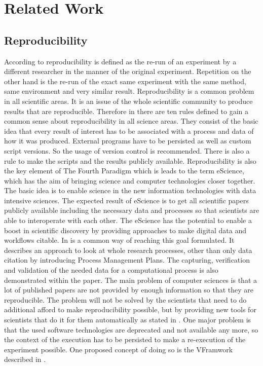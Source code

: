 \documentclass[draft,final]{vutinfth} %
\begin{document}
\chapter{Related Work}\label{Related Work}


\section{Reproducibility}\label{Reproducibility}
According to \cite{6064509} reproducibility is defined as the re-run of an experiment by a different researcher in the manner of the original experiment. Repetition on the other hand is the re-run of the exact same experiment with the same method, same environment and very similar result. 
Reproducibility is a common problem in all scientific areas. It is an issue of the whole scientific community to produce results that are reproducible. Therefore in \cite{10.1371/journal.pcbi.1003285} there are ten rules defined to gain a common sense about reproducibility in all science areas. They consist of the basic idea that every result of interest has to be associated with a process and data of how it was produced. External programs have to be persisted as well as custom script versions. So the usage of version control is recommended. There is also a rule to make the scripts and the results publicly available. \cite{10.1371/journal.pcbi.1003285} 
Reproducibility is also the key element of The Fourth Paradigm \cite{noauthororeditorfourth} which is leads to the term eScience, which has the aim of bringing science and computer technologies closer together. The basic idea is to enable science in the new information technologies with data intensive sciences. The expected result of eScience is to get all scientific papers publicly available including the necessary data and processes so that scientists are able to interoperate with each other. \cite{noauthororeditorfourth}
The eScience has the potential to enable a boost in scientific discovery by providing approaches to make digital data and workflows citable. In \cite{Rauber2015RepeatabilityAR} is a common way of reaching this goal formulated. It describes an approach to look at whole research processes, other than only data citation by introducing Process Management Plans. The capturing, verification and validation of the needed data for a computational process is also demonstrated within the paper.\cite{Rauber2015RepeatabilityAR}
The main problem of computer sciences is that a lot of published papers are not provided by enough information so that they are reproducible. The problem will not be solved by the scientists that need to do additional afford to make reproducibility possible, but by providing new tools for scientists that do it for them automatically as stated in \cite{MIKSA201725}. One major problem is that the used software technologies are deprecated and not available any more, so the context of the execution has to be persisted to make a re-execution of the experiment possible. One proposed concept of doing so is the VFramwork described in \cite{Miksa2013FrameworkFV}. 
\end{document}
